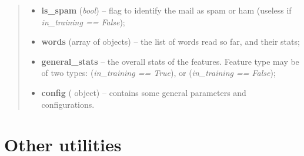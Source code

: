 \documentclass[letterpaper,10pt,english]{sphinxmanual}
\begin{document}
\begin{fulllineitems}
\begin{fulllineitems}
\begin{quote}
\begin{description}
\begin{itemize}
\item {} 
\textbf{is\_spam} (\emph{bool}) -- flag to identify the mail as spam or ham (useless if             \emph{in\_training == False});

\item {} 
\textbf{words} (array of {\hyperref[index:gen_stat.Word]{}} objects) -- the list of words read so far, and their stats;

\item {} 
\textbf{general\_stats} -- the overall stats of the features. Feature type may be            of two types:                {\hyperref[index:gen_stat.Stat]{}} (\emph{in\_training == True}), or                 (\emph{in\_training == False});

\item {} 
\textbf{config} ({\hyperref[index:config.Config]{}} object) -- contains some general parameters and configurations.

\end{itemize}

\end{description}\end{quote}

\end{fulllineitems}


\end{fulllineitems}



\section{Other utilities}
\label{index:other-utilities}\label{index:module-utils}
\end{document}
